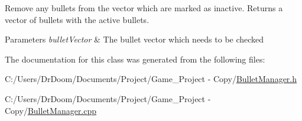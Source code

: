 Remove any bullets from the vector which are marked as inactive. Returns a vector of bullets with the active bullets. 


\begin{DoxyParams}{Parameters}
{\em bullet\+Vector} & The bullet vector which needs to be checked \\
\hline
\end{DoxyParams}


The documentation for this class was generated from the following files\+:\begin{DoxyCompactItemize}
\item 
C\+:/\+Users/\+Dr\+Doom/\+Documents/\+Project/\+Game\+\_\+\+Project -\/ Copy/\hyperlink{_bullet_manager_8h}{Bullet\+Manager.\+h}\item 
C\+:/\+Users/\+Dr\+Doom/\+Documents/\+Project/\+Game\+\_\+\+Project -\/ Copy/\hyperlink{_bullet_manager_8cpp}{Bullet\+Manager.\+cpp}\end{DoxyCompactItemize}
